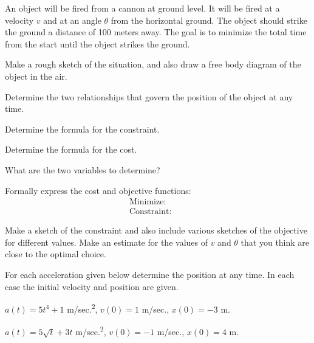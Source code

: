 \begin{problem}
\item An object will be fired from a cannon at ground level. It will
  be fired at a velocity $v$ and at an angle $\theta$ from the
  horizontal ground.  The object should strike the ground a distance
  of 100 meters away. The goal is to minimize the total time from the
  start until the object strikes the ground.
  \begin{subproblem}
  \item Make a rough sketch of the situation, and also draw a free
    body diagram of the object in the air.
    \vfill
  \item Determine the two relationships that govern the position of
    the object at any time.
    \vfill
  \item Determine the formula for the constraint.
    \vfill
  \item Determine the formula for the cost.
    \vfill

    \clearpage

  \item What are the two variables to determine?
    \vspace{2em}

  \item Formally express the cost and objective functions:
    \begin{eqnarray*}
      \mathrm{Minimize:} & &  \\
      \mathrm{Constraint:} & & 
    \end{eqnarray*}


  \item Make a sketch of the constraint and also include various
    sketches of the objective for different values. Make an estimate
    for the values of $v$ and $\theta$ that you think are close to the
    optimal choice.

    \vfill

  \item 

  \end{subproblem}

\end{problem}




\begin{problem}
\item For each acceleration given below determine the position at any
  time. In each case the initial velocity and position are given.
  \begin{subproblem}
  \item $a(t)=5t^4+1$ m/sec.\textsuperscript{2}, $v(0)=1$ m/sec.,
    $x(0)=-3$ m.
    \vfill
  \item $a(t)=5\sqrt{t}+3t$ m/sec.\textsuperscript{2}, $v(0)=-1$ m/sec.,
    $x(0)=4$ m.
    \vfill
  \end{subproblem}
\end{problem}


